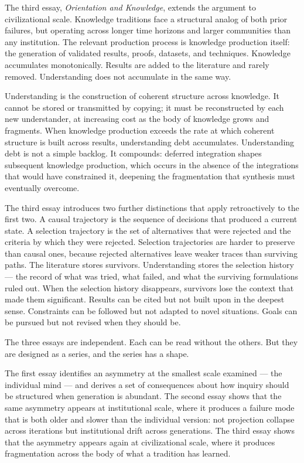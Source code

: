 The third essay, \textit{Orientation and Knowledge}, extends the argument
to civilizational scale. Knowledge traditions face a structural analog of
both prior failures, but operating across longer time horizons and larger
communities than any institution. The relevant production process is knowledge
production itself: the generation of validated results, proofs, datasets, and
techniques. Knowledge accumulates monotonically. Results are added to the
literature and rarely removed. Understanding does not accumulate in the same
way.

Understanding is the construction of coherent structure across knowledge.
It cannot be stored or transmitted by copying; it must be reconstructed by
each new understander, at increasing cost as the body of knowledge grows and
fragments. When knowledge production exceeds the rate at which coherent
structure is built across results, understanding debt accumulates. Understanding
debt is not a simple backlog. It compounds: deferred integration shapes
subsequent knowledge production, which occurs in the absence of the integrations
that would have constrained it, deepening the fragmentation that synthesis
must eventually overcome.

The third essay introduces two further distinctions that apply retroactively
to the first two. A causal trajectory is the sequence of decisions that
produced a current state. A selection trajectory is the set of alternatives
that were rejected and the criteria by which they were rejected. Selection
trajectories are harder to preserve than causal ones, because rejected
alternatives leave weaker traces than surviving paths. The literature stores
survivors. Understanding stores the selection history --- the record of what
was tried, what failed, and what the surviving formulations ruled out. When
the selection history disappears, survivors lose the context that made them
significant. Results can be cited but not built upon in the deepest sense.
Constraints can be followed but not adapted to novel situations. Goals can
be pursued but not revised when they should be.

\bigskip

The three essays are independent. Each can be read without the others. But
they are designed as a series, and the series has a shape.

The first essay identifies an asymmetry at the smallest scale examined ---
the individual mind --- and derives a set of consequences about how inquiry
should be structured when generation is abundant. The second essay shows
that the same asymmetry appears at institutional scale, where it produces
a failure mode that is both older and slower than the individual version:
not projection collapse across iterations but institutional drift across
generations. The third essay shows that the asymmetry appears again at
civilizational scale, where it produces fragmentation across the body of
what a tradition has learned.

